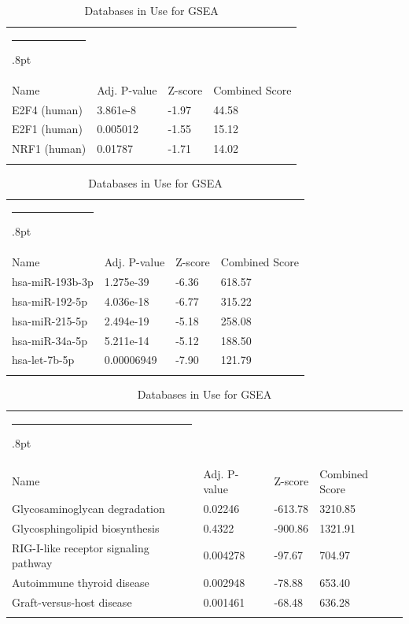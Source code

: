 \documentclass[3p,authoryear,preprint,12pt]{elsarticle}
\makeatletter
\def\hlinewd#1{%
  \noalign{\ifnum0=`}\fi\hrule \@height #1%
  \futurelet\reserved@a\@xhline}
\def\tbltoprule{\hlinewd{.8pt}\\[-12pt]}
\def\tblbottomrule{\noalign{\vspace*{6pt}}\hline\noalign{\vspace*{2pt}}}
\def\tblmidrule{\noalign{\vspace*{6pt}}\hline\noalign{\vspace*{2pt}}}
\makeatother
\begin{document}
\begin{table}[!htbp]
	\caption{{Databases in Use for GSEA} }
	\label{tw-de478ae31cc6}
	\def\arraystretch{1}
	\ignorespaces 
	\centering 
	\begin{tabulary}{\linewidth}{p{\dimexpr.65\tabcolsep}p{\dimexpr.15\tabcolsep}p{\dimexpr.1\tabcolsep}p{\dimexpr.1\tabcolsep}}
		\tbltoprule Name & Adj. P-value & Z-score & Combined Score\\
		\tblmidrule
E2F4 (human) & 3.861e-8 & -1.97 & 44.58 \\
E2F1 (human) & 0.005012 & -1.55 & 15.12 \\
NRF1 (human) & 0.01787 & -1.71 & 14.02 \\
		\tblbottomrule
	\end{tabulary}\par 
\end{table}
\begin{table}[!htbp]
	\caption{{Databases in Use for GSEA} }
	\label{tw-de478ae31cc6}
	\def\arraystretch{1}
	\ignorespaces 
	\centering 
	\begin{tabulary}{\linewidth}{p{\dimexpr.65\tabcolsep}p{\dimexpr.15\tabcolsep}p{\dimexpr.1\tabcolsep}p{\dimexpr.1\tabcolsep}}
		\tbltoprule Name & Adj. P-value & Z-score & Combined Score\\
		\tblmidrule
hsa-miR-193b-3p & 1.275e-39 & -6.36 & 618.57 \\
hsa-miR-192-5p & 4.036e-18 & -6.77 & 315.22 \\
hsa-miR-215-5p & 2.494e-19 & -5.18 & 258.08 \\
hsa-miR-34a-5p & 5.211e-14 & -5.12 & 188.50 \\
hsa-let-7b-5p & 0.00006949 & -7.90 & 121.79 \\
		\tblbottomrule
	\end{tabulary}\par 
\end{table}
\begin{table}[!htbp]
	\caption{{Databases in Use for GSEA} }
	\label{tw-de478ae31cc6}
	\def\arraystretch{1}
	\ignorespaces 
	\centering 
	\begin{tabulary}{\linewidth}{p{\dimexpr.65\tabcolsep}p{\dimexpr.15\tabcolsep}p{\dimexpr.1\tabcolsep}p{\dimexpr.1\tabcolsep}}
		\tbltoprule Name & Adj. P-value & Z-score & Combined Score\\
		\tblmidrule
Glycosaminoglycan degradation & 0.02246 & -613.78 & 3210.85 \\
Glycosphingolipid biosynthesis & 0.4322 & -900.86 & 1321.91 \\
RIG-I-like receptor signaling pathway & 0.004278 & -97.67 & 704.97 \\
Autoimmune thyroid disease & 0.002948 & -78.88 & 653.40 \\
Graft-versus-host disease & 0.001461 & -68.48 & 636.28 \\
		\tblbottomrule
	\end{tabulary}\par 
\end{table}
\end{document}
